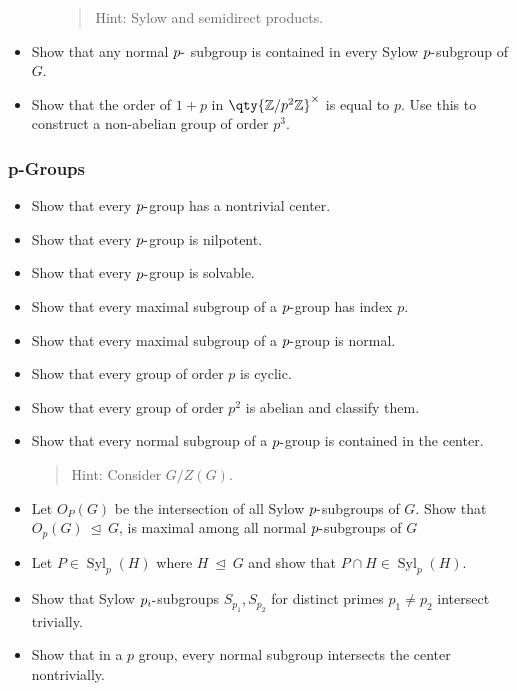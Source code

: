 \begin{itemize}
\begin{itemize}
    \begin{quote}
    Hint: Sylow and semidirect products.
    \end{quote}
  \end{itemize}
\item
  Show that any normal \(p{\hbox{-}}\) subgroup is contained in every
  Sylow \(p{\hbox{-}}\)subgroup of \(G\).
\item
  Show that the order of \(1+p\) in
  \(\qty{{\mathbb{Z}}/p^2{\mathbb{Z}}}^{\times}\) is equal to \(p\). Use
  this to construct a non-abelian group of order \(p^3\).
\end{itemize}

\hypertarget{p-groups}{%
\subsubsection{p-Groups}\label{p-groups}}

\begin{itemize}
\item
  Show that every \(p{\hbox{-}}\)group has a nontrivial center.
\item
  Show that every \(p{\hbox{-}}\)group is nilpotent.
\item
  Show that every \(p{\hbox{-}}\)group is solvable.
\item
  Show that every maximal subgroup of a \(p{\hbox{-}}\)group has index
  \(p\).
\item
  Show that every maximal subgroup of a \(p{\hbox{-}}\)group is normal.
\item
  Show that every group of order \(p\) is cyclic.
\item
  Show that every group of order \(p^2\) is abelian and classify them.
\item
  Show that every normal subgroup of a \(p{\hbox{-}}\)group is contained
  in the center.

  \begin{quote}
  Hint: Consider \(G/Z(G)\).
  \end{quote}
\item
  Let \(O_P(G)\) be the intersection of all Sylow
  \(p{\hbox{-}}\)subgroups of \(G\). Show that
  \(O_p(G) {~\trianglelefteq~}G\), is maximal among all normal
  \(p{\hbox{-}}\)subgroups of \(G\)
\item
  Let \(P\in {\operatorname{Syl}}_p(H)\) where \(H{~\trianglelefteq~}G\)
  and show that \(P\cap H \in {\operatorname{Syl}}_p(H)\).
\item
  Show that Sylow \(p_i{\hbox{-}}\)subgroups \(S_{p_1}, S_{p_2}\) for
  distinct primes \(p_1\neq p_2\) intersect trivially.
\item
  Show that in a \(p\) group, every normal subgroup intersects the
  center nontrivially.
\end{itemize}

